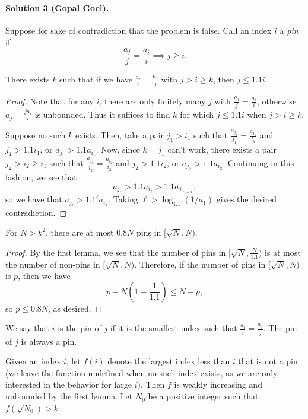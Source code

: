 \documentclass[11pt]{scrartcl}
\begin{document}
\paragraph{Solution 3 (Gopal Goel).}

Suppose for sake of contradiction that the problem is false. Call an index $i$ a
\emph{pin} if
\[\frac{a_j}{j} = \frac{a_i}{i} \implies j\ge i.\]
\begin{lemma*}
There exists $k$ such that if we have $\tfrac{a_i}{i}=\tfrac{a_j}{j}$ with
$j > i \ge k$, then $j\le 1.1i$.
\end{lemma*}
\begin{proof}
  Note that for any $i$, there are only finitely many $j$ with
  $\frac{a_j}{j}=\frac{a_i}{i}$, otherwise $a_j=\frac{ja_i}{i}$ is unbounded.
  Thus it suffices to find $k$ for which $j\leq 1.1i$ when $j > i\geq k$.

  Suppose no such $k$ exists. Then, take a pair $j_1>i_1$ such that
  $\tfrac{a_{j_1}}{j_1} = \tfrac{a_{i_1}}{i_1}$ and $j_1>1.1i_1$, or
  $a_{j_1}>1.1a_{i_1}$. Now, since $k=j_1$ can't work, there exists a pair
  $j_2>i_2\ge i_1$ such that $\tfrac{a_{j_2}}{j_2} = \tfrac{a_{i_2}}{i_2}$ and
  $j_2>1.1i_2$, or $a_{j_2}>1.1a_{i_2}$. Continuing in this fashion, we see that
  \[a_{j_\ell}>1.1a_{i_\ell}> 1.1a_{j_{\ell-1}},\]
  so we have that $a_{j_\ell}>1.1^\ell a_{i_1}$. Taking $\ell>\log_{1.1}(1/a_1)$ gives the desired contradiction.
\end{proof}

\begin{lemma*}
For $N>k^2$, there are at most $0.8N$ pins in $[\sqrt{N},N)$.
\end{lemma*}
\begin{proof}
By the first lemma, we see that the number of pins in $[\sqrt{N},\tfrac{N}{1.1})$ is at most the number of non-pins in $[\sqrt{N},N)$. Therefore, if the number of pins in $[\sqrt{N},N)$ is $p$, then we have
\[p-N\left(1-\frac{1}{1.1}\right)\le N-p,\]
so $p\le 0.8N$, as desired.
\end{proof}
We say that $i$ is the pin of $j$ if it is the smallest index such that
$\tfrac{a_i}{i}=\tfrac{a_j}{j}$. The pin of $j$ is always a pin.

Given an index $i$, let $f(i)$ denote the largest index less than $i$ that is
not a pin (we leave the function undefined when no such index exists, as we are
only interested in the behavior for large $i$). Then $f$ is weakly increasing
and unbounded by the first lemma. Let $N_0$ be a positive integer such that
$f(\sqrt{N_0}) > k$.
\end{document}
